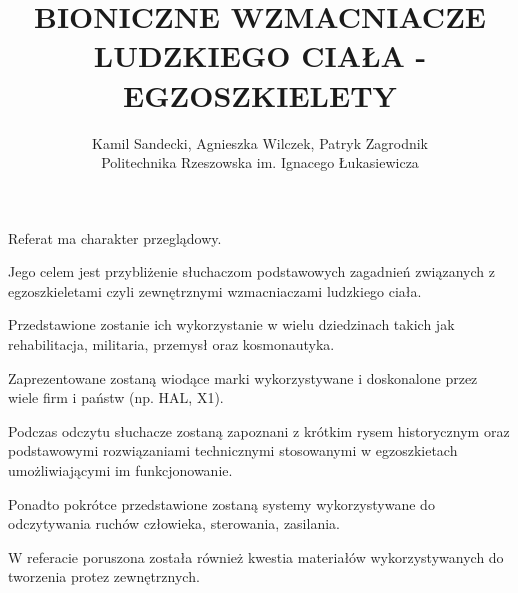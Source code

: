 \documentclass[12pt, a4paper]{article}
\begin{document}
\title{BIONICZNE WZMACNIACZE LUDZKIEGO CIAŁA - EGZOSZKIELETY}
\author{Kamil Sandecki, Agnieszka Wilczek, Patryk Zagrodnik \\ Politechnika Rzeszowska im. Ignacego Łukasiewicza}

\maketitle


Referat ma charakter przeglądowy. 

Jego celem jest przybliżenie słuchaczom podstawowych zagadnień związanych z egzoszkieletami czyli zewnętrznymi wzmacniaczami ludzkiego ciała. 

Przedstawione zostanie ich wykorzystanie w wielu dziedzinach takich jak rehabilitacja, militaria, przemysł oraz kosmonautyka. 

Zaprezentowane zostaną wiodące marki wykorzystywane i doskonalone przez wiele firm i państw (np. HAL, X1). 

Podczas odczytu słuchacze zostaną zapoznani z krótkim rysem historycznym oraz podstawowymi rozwiązaniami technicznymi stosowanymi w egzoszkietach umożliwiającymi im funkcjonowanie.

Ponadto pokrótce przedstawione zostaną systemy wykorzystywane do odczytywania ruchów człowieka, sterowania, zasilania. 

W referacie poruszona została również kwestia materiałów wykorzystywanych do tworzenia protez zewnętrznych.
\end{document}
